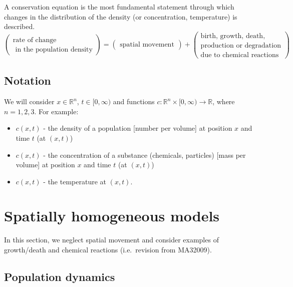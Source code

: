 \documentclass[
  letterpaper,
  DIV=11,
  numbers=noendperiod]{scrreprt}
\providecommand{\tightlist}{%
  \setlength{\itemsep}{0pt}\setlength{\parskip}{0pt}}\usepackage{longtable,booktabs,array}
\theoremstyle{definition}
\theoremstyle{plain}
\theoremstyle{plain}
\theoremstyle{remark}
\begin{document}
A conservation equation is the most fundamental statement through which
changes in the distribution of the density (or concentration,
temperature) is described. \[
\begin{pmatrix}
\text{rate of change}\\
\text{ in the population density} 
\end{pmatrix}
= \begin{pmatrix}
\text{spatial movement}
\end{pmatrix}
+ 
 \begin{pmatrix}
 \text{birth, growth, death},\\
 \text{production or degradation}\\
  \text{due to chemical reactions} 
\end{pmatrix}
\]

\hypertarget{notation}{%
\subsection{Notation}\label{notation}}

We will consider \(x \in \mathbb R^n\), \(t \in [0, \infty)\) and
functions \(c: \mathbb R^n \times [0, \infty) \to \mathbb R\), where
\(n=1,2,3\). For example:

\begin{itemize}
\tightlist
\item
  \(c(x,t)\) - the density of a population {[}number per volume{]} at
  position \(x\) and time \(t\) (at \((x,t)\))
\item
  \(c(x,t)\) - the concentration of a substance (chemicals, particles)
  {[}mass per volume{]} at position \(x\) and time \(t\) (at \((x,t)\))
\item
  \(c(x,t)\) - the temperature at \((x,t)\).
\end{itemize}

\hypertarget{spatially-homogeneous-models}{%
\section{Spatially homogeneous
models}\label{spatially-homogeneous-models}}

In this section, we neglect spatial movement and consider examples of
growth/death and chemical reactions (i.e.~revision from MA32009).

\hypertarget{population-dynamics}{%
\subsection{Population dynamics}\label{population-dynamics}}
\end{document}
